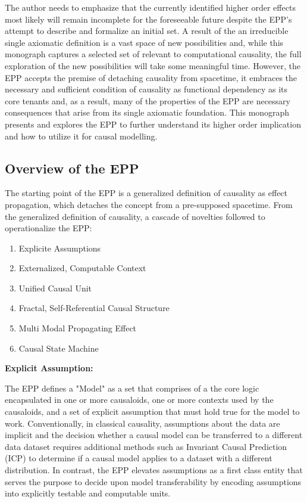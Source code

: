 The author needs to emphasize that the currently identified higher order effects most likely will remain incomplete for the foreseeable future despite the EPP's attempt to describe and formalize an initial set. A result of the an irreducible single axiomatic definition  is a vast space of new possibilities and, while this monograph captures a selected set of relevant to computational causality, the full exploration of the new possibilities will take some meaningful time. However, the EPP accepts the premise of detaching causality from spacetime, it embraces the necessary and sufficient condition of causality as functional dependency as its core tenants and, as a result, many of the properties of the EPP are necessary consequences that arise from its single axiomatic foundation. This monograph presents and explores the EPP to further understand its higher order implication and how to utilize it for causal modelling. 
% 
%
\subsection{Overview of the EPP}
\label{sec:epp_overview}

The starting point of the EPP is a generalized definition of causality as effect propagation, which detaches the concept from a pre-supposed spacetime. From the generalized definition of causality, a cascade of novelties followed to operationalize the EPP:

\begin{enumerate}
	\item Explicite Assumptions 
	\item Externalized, Computable Context
	\item Unified Causal Unit
	\item Fractal, Self-Referential Causal Structure
	\item Multi Modal Propagating Effect
	\item Causal State Machine 
\end{enumerate}


\textbf{Explicit Assumption:}

The EPP defines a "Model" as a set that comprises of a the core logic encapsulated in one or more causaloids, one or more contexts used by the causaloids, and a set of explicit assumption that must hold true for the model to work. Conventionally, in classical causality, assumptions about the data are  implicit and the decision whether a causal model can be transferred to a different data dataset requires additional methods such as Invariant Causal Prediction (ICP) to determine if a causal model applies to a dataset with a different distribution. In contrast, the EPP elevates assumptions as a first class entity that serves the purpose to decide upon model transferability by encoding assumptions into explicitly testable and computable units. 

